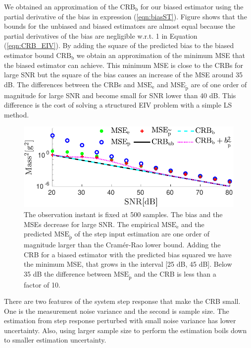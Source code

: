 We obtained an approximation of the $\mathrm{CRB}_{\mathrm{b}}$ for our biased estimator using the partial derivative of the bias in expression (\ref{eqn:biasST}).
Figure \label{fig:MSE_CRB} shows that the bounds for the unbiased and biased estimators are almost equal because the partial derivatives of the bias are negligible w.r.t. 1 in Equation (\ref{eqn:CRB_EIV}).
By adding the square of the predicted bias to the biased estimator bound $\mathrm{CRB_{b}}$ we obtain an approximation of the minimum MSE that the biased estimator can achieve.
This minimum MSE is close to the CRBs for large SNR but the square of the bias causes an increase of the MSE around 35 dB.
The differences between the CRBs and $\mathrm{MSE}_\mathrm{e}$ and $\mathrm{MSE}_{\widetilde{\mathrm{p}}}$ are of one order of magnitude for large SNR and become small for SNR lower than 40 dB.
This difference is the cost of solving a structured EIV problem with a simple LS method.


\begin{figure}[!htb]
\centering
\includegraphics[width=1.0\columnwidth]{./ChapterExperimentalValidation/fig/Fig_3.pdf}
\caption{\label{fig:MSE_CRB} The observation instant is fixed at 500 samples.
The bias and the MSEs decrease for large SNR. 
The empirical $\mathrm{MSE_e}$ and the predicted $\mathrm{MSE}_{\widetilde{\mathrm{p}}}$ of the step input estimation are one order of magnitude larger than the Cram\'er-Rao lower bound.
Adding the CRB for a biased estimator with the predicted bias squared we have the minimum MSE, that grows in the interval [25 dB, 45 dB].
Below 35 dB the difference between $\mathrm{MSE}_{\widetilde{\mathrm{p}}}$ and the CRB is less than a factor of 10.}
\end{figure}

There are two features of the system step response that make the CRB small.
One is the measurement noise variance and the second is sample size.
The estimation from step response perturbed with small noise variance has lower uncertainty.
Also, using larger sample size to perform the estimation boils down to smaller estimation uncertainty.

